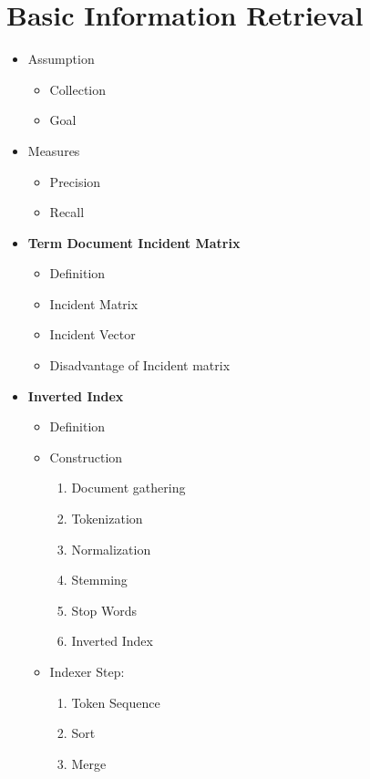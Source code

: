 \chapter{Basic Information Retrieval}
\begin{itemize}
    \item Assumption
    \begin{itemize}
        \item Collection
        \item Goal
    \end{itemize}
    \item Measures
    \begin{itemize}
        \item Precision
        \item Recall
    \end{itemize}
    \item \textbf{Term Document Incident Matrix}
    \begin{itemize}
        \item Definition
        \item Incident Matrix
        \item Incident Vector
        \item Disadvantage of Incident matrix
    \end{itemize}
    \item \textbf{Inverted Index}
    \begin{itemize}
        \item Definition
        \item Construction
        \begin{enumerate}
            \item Document gathering
            \item Tokenization
            \item Normalization
            \item Stemming
            \item Stop Words
            \item Inverted Index
        \end{enumerate}
        \item Indexer Step:
        \begin{enumerate}
            \item Token Sequence
            \item Sort
            \item Merge
        \end{enumerate}
    \end{itemize}

\end{itemize}
